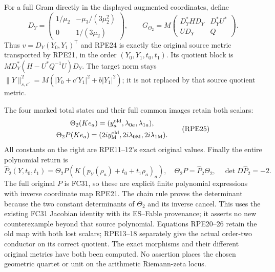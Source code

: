 For a full Gram directly in the displayed augmented coordinates,
define
\[
 D_Y=\begin{pmatrix}
 1/\mu_2&-\mu_3/(3\mu_2^2)\\0&1/(3\mu_2)
 \end{pmatrix},\qquad
 G_{\Theta_2}=M\begin{pmatrix}
 D_Y^*HD_Y&D_Y^*U^*\\UD_Y&Q
 \end{pmatrix}.
 \tag{RPE24}
\]
Thus $v=D_Y(Y_0,Y_1)^{\mathsf T}$ and RPE24 is exactly the
original source metric transported by RPE21, in the order
$(Y_0,Y_1,t_0,t_1)$. Its quotient block is
$M D_Y^*(H-U^*Q^{-1}U)D_Y$.
The target norm stays
$\|Y\|_{s,c'}^2=M(|Y_0+c'Y_1|^2+b|Y_1|^2)$; it is not
replaced by that source quotient metric.

The four marked total states and their full common images retain
both scalars:
\[
 \begin{gathered}
 \Theta_2(Ke_a)=(y_a^{\rm old},\lambda_{0a},\lambda_{1a}),\\
 \Theta_2P(Ke_a)
   =(2i y_{\mathrm M}^{\rm old},
          2i\lambda_{0\mathrm M},2i\lambda_{1\mathrm M}).
 \end{gathered}\tag{RPE25}
\]
All constants on the right are RPE11--12's exact original values.
Finally the entire polynomial return is
\[
 \widehat P_2(Y,t_0,t_1)
  =\Theta_2P\!\left(K(p_Y(\rho_a)+t_0+t_1\rho_a)_a\right),
 \quad \Theta_2P=\widehat P_2\Theta_2,
 \quad\det D\widehat P_2=-2.
 \tag{RPE26}
\]
The full original $P$ is FC31, so these are explicit finite
polynomial expressions with inverse coordinate map RPE21.
The chain rule proves the determinant because the two constant
determinants of $\Theta_2$ and its inverse cancel. This uses the
existing FC31 Jacobian identity with its ES--Fable provenance; it
asserts no new counterexample beyond that source polynomial.
Equations RPE20--26 retain the old map with both lost scalars;
RPE13--18 separately give the actual order-two conductor on its
correct quotient. The exact morphisms and their different original
metrics have both been computed.
No assertion places the chosen geometric quartet or unit on the
arithmetic Riemann-zeta locus.
